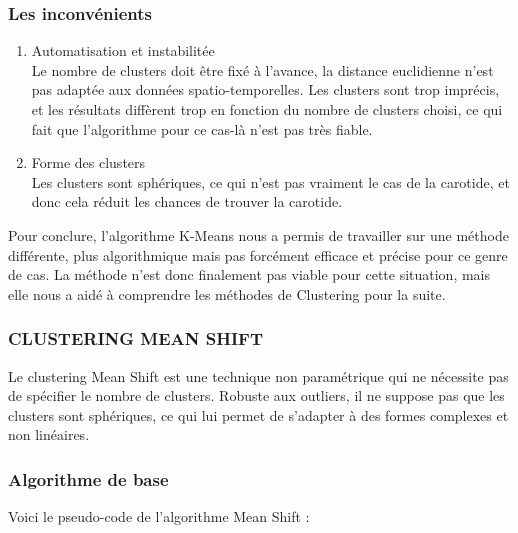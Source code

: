 \documentclass{article}
\begin{document}
            \subsubsection*{Les inconvénients}
            \begin{enumerate}
                \item Automatisation et instabilitée\\
                Le nombre de clusters doit être fixé à l'avance, la distance euclidienne n'est pas adaptée aux données spatio-temporelles. Les clusters sont trop imprécis, et les résultats diffèrent trop en fonction du nombre de clusters choisi, ce qui fait que l'algorithme pour ce cas-là n'est pas très fiable.\\
                \item Forme des clusters\\
                Les clusters sont sphériques, ce qui n'est pas vraiment le cas de la carotide, et donc cela réduit les chances de trouver la carotide.\\
            \end{enumerate}
         
            Pour conclure, l'algorithme K-Means nous a permis de travailler sur une méthode différente, plus algorithmique mais pas forcément efficace et précise pour ce genre de cas. La méthode n'est donc finalement pas viable pour cette situation, mais elle nous a aidé à comprendre les méthodes de Clustering pour la suite.
            
    \hspace{1cm}   
    \newpage


       
        \subsubsection{CLUSTERING MEAN SHIFT}
        \emph{}
            Le clustering Mean Shift est une technique non paramétrique qui ne nécessite pas de spécifier le nombre de clusters. Robuste aux outliers, il ne suppose pas que les clusters sont sphériques, ce qui lui permet de s'adapter à des formes complexes et non linéaires.
        
        \subsubsection*{Algorithme de base}
           Voici le pseudo-code de l'algorithme Mean Shift :
\end{document}
